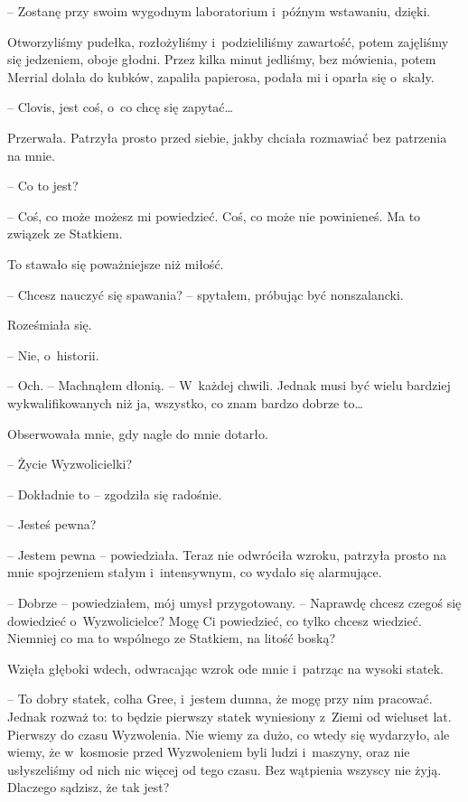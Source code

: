 \documentclass[oneside,polish,11pt,sfheadings]{mwbk}
\begin{document}
-- Zostanę przy swoim wygodnym laboratorium i~późnym wstawaniu, dzięki.

Otworzyliśmy pudełka, rozłożyliśmy i~podzieliliśmy zawartość, potem
zajęliśmy się jedzeniem, oboje głodni. Przez kilka minut jedliśmy, bez
mówienia, potem Merrial dolała do kubków, zapaliła papierosa, podała mi
i oparła się o~skały.

-- Clovis, jest coś, o~co chcę się zapytać\ldots

Przerwała. Patrzyła prosto przed siebie, jakby chciała rozmawiać bez
patrzenia na mnie.

-- Co to jest?

-- Coś, co może możesz mi powiedzieć. Coś, co może nie powinieneś. Ma to
związek ze Statkiem.

To stawało się poważniejsze niż miłość.

-- Chcesz nauczyć się spawania? -- spytałem, próbując być nonszalancki.

Roześmiała się. 

-- Nie, o~historii.

-- Och. -- Machnąłem dłonią. -- W~każdej chwili. Jednak musi być wielu
bardziej wykwalifikowanych niż ja, wszystko, co znam bardzo dobrze to\ldots

Obserwowała mnie, gdy nagle do mnie dotarło.

-- Życie Wyzwolicielki?

-- Dokładnie to -- zgodziła się radośnie.

-- Jesteś pewna?

-- Jestem pewna -- powiedziała. Teraz nie odwróciła wzroku, patrzyła
prosto na mnie spojrzeniem stałym i~intensywnym, co wydało się
alarmujące.

-- Dobrze -- powiedziałem, mój umysł przygotowany. -- Naprawdę chcesz
czegoś się dowiedzieć o~Wyzwolicielce? Mogę Ci powiedzieć, co tylko
chcesz wiedzieć. Niemniej co ma to wspólnego ze Statkiem, na litość
boską?

Wzięła głęboki wdech, odwracając wzrok ode mnie i~patrząc na wysoki
statek. 

-- To dobry statek, colha Gree, i~jestem dumna, że mogę przy nim
pracować. Jednak rozważ to: to będzie pierwszy statek wyniesiony z~Ziemi
od wieluset lat. Pierwszy do czasu Wyzwolenia. Nie wiemy za dużo, co
wtedy się wydarzyło, ale wiemy, że w~kosmosie przed Wyzwoleniem byli
ludzi i~maszyny, oraz nie usłyszeliśmy od nich nic więcej od tego czasu.
Bez wątpienia wszyscy nie żyją. Dlaczego sądzisz, że tak jest?
\end{document}
